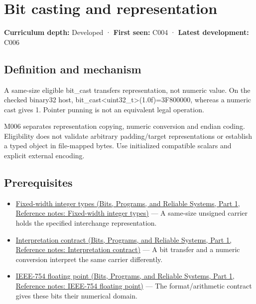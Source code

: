 \hypertarget{appendix-34ee45f161c1}{}\label{referencestart:appendix-34ee45f161c1}
\section{Bit casting and representation}\label{appendix-34ee45f161c1-bit-casting-and-representation}

\hypertarget{appendix-34ee45f161c1-bit-casting-and-representation}{}

\textbf{Curriculum depth:} Developed · \textbf{First seen:} C004 · \textbf{Latest development:} C006

\begin{allmightroledefinition}

\subsection{Definition and mechanism}\label{appendix-34ee45f161c1-definition-and-mechanism}

\hypertarget{appendix-34ee45f161c1-definition-and-mechanism}{}

A same-size eligible bit\_cast transfers representation, not numeric value. On the checked binary32 host, bit\_cast\textless uint32\_t\textgreater{}(1.0f)=3F800000, whereas a numeric cast gives 1. Pointer punning is not an equivalent legal operation.

\end{allmightroledefinition}

M006 separates representation copying, numeric conversion and endian coding. Eligibility does not validate arbitrary padding/target representations or establish a typed object in file-mapped bytes. Use initialized compatible scalars and explicit external encoding.

\subsection{Prerequisites}\label{appendix-34ee45f161c1-prerequisites}

\hypertarget{appendix-34ee45f161c1-prerequisites}{}

\begin{itemize}
\tightlist
\item
  \href{../01-Bits-Programs-and-Reliable-Systems-P01/main.pdf\#nameddest=appendix-cc04044b5782}{Fixed-width integer types (Bits, Programs, and Reliable Systems, Part 1, Reference notes: Fixed-width integer types)} --- A same-size unsigned carrier holds the specified interchange representation.
\item
  \href{../01-Bits-Programs-and-Reliable-Systems-P01/main.pdf\#nameddest=appendix-f414bd4ed05c}{Interpretation contract (Bits, Programs, and Reliable Systems, Part 1, Reference notes: Interpretation contract)} --- A bit transfer and a numeric conversion interpret the same carrier differently.
\item
  \href{../01-Bits-Programs-and-Reliable-Systems-P01/main.pdf\#nameddest=appendix-343615f49ddf}{IEEE-754 floating point (Bits, Programs, and Reliable Systems, Part 1, Reference notes: IEEE-754 floating point)} --- The format/arithmetic contract gives these bits their numerical domain.
\end{itemize}

